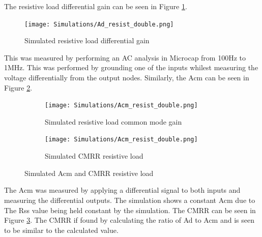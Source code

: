 The resistive load differential gain can be seen in Figure \ref{fig:adsimresist}.


\begin{figure}[H]
    \begin{center}
    \texttt{[image: Simulations/Ad\_resist\_double.png]}
    \caption{Simulated resistive load differential gain}
    \label{fig:adsimresist}
    \end{center}
\end{figure}
This was measured by performing an AC analysis in Microcap from 100Hz to 1MHz. This was performed by grounding one of the inputs whilest measuring the voltage differentially from the output nodes. Similarly, the Acm can be seen in Figure \ref{fig:acmresistsim}.


\begin{figure}[H]
    \begin{subfigure}[b]{0.45\textwidth}
    \centering
    \texttt{[image: Simulations/Acm\_resist\_double.png]}
    \caption{Simulated resistive load common mode gain}
    \label{fig:acmresistsim}
\end{subfigure}
    \hfill
     \begin{subfigure}[b]{0.45\textwidth}
    \centering
    \texttt{[image: Simulations/Acm\_resist\_double.png]}
    \caption{Simulated CMRR resistive load}
    \label{fig:cmrrsimres}
\end{subfigure}
    \caption{Simulated Acm and CMRR resistive load}
    \label{fig:acmcmrrsim}
\end{figure} 

The Acm was measured by applying a differential signal to both inputs and measuring the differential outputs.
The simulation shows a constant Acm due to The Rss value being held constant by the simulation. The CMRR can be seen in Figure \ref{fig:cmrrsimres}. The CMRR if found by calculating the ratio of Ad to Acm and is seen to be similar to the calculated value.


